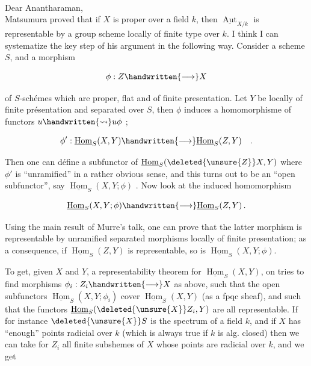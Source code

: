 \\

Dear Anantharaman,\\

Matsumura proved that if $X$ is proper over a field $k$, then $\underline{\operatorname{Aut}}_{X/k}$ is representable by a group scheme locally of finite type over $k$. I think I can systematize the key step of his argument in the following way. Consider a scheme $S$, and a morphism

\[
\phi: Z\handwritten{\longrightarrow} X
\]

of $S$-schémes which are proper, flat and of finite presentation. Let $Y$ be locally of finite présentation and separated over $S$, then $\phi$ induces a homomorphisme of functors $u\handwritten{\leadsto}u\phi$ ;

\[
\phi':\underline{\operatorname{Hom}}_S(X,Y)\handwritten{\longrightarrow}\underline{\operatorname{Hom}}_S(Z,Y)\quad .
\]

Then one can défine a subfunctor of $\underline{\operatorname{Hom}}_S(\deleted{\unsure{Z}}X,Y)$ where $\phi'$ is ``unramified'' in a rather obvious sense, and this turns out to be an ``open subfunctor'', say $\underline{\operatorname{Hom}}_S(X,Y;\phi)$ . Now look at the induced homomorphism

\[
\underline{\operatorname{Hom}}_S(X,Y;\phi)\handwritten{\longrightarrow}\underline{\operatorname{Hom}}_S(Z,Y)\,.
\]

Using the main result of Murre's talk, one can prove that the latter morphism is representable by unramified separated morphisms locally of finite presentation; as a consequence, if $\underline{\operatorname{Hom}}_S(Z,Y)$ is representable, so is $\underline{\operatorname{Hom}}_S(X,Y;\phi)$.

To get, given $X$ and $Y$, a representability theorem for $\underline{\operatorname{Hom}}_S(X,Y)$, on tries to find morphisms $\phi_i:Z_i\handwritten{\longrightarrow}X$ as above, such that the open subfunctors $\underline{\operatorname{Hom}}_S(X,Y;\phi_i)$ cover $\underline{\operatorname{Hom}}_S(X,Y)$ (as a fpqc sheaf), and such that the functors $\underline{\operatorname{Hom}}_S(\deleted{\unsure{X}}Z_i,Y)$ are all representable. If for instance $\deleted{\unsure{X}}S$ is the spectrum of a field $k$, and if $X$ has ``enough'' points radicial over $k$ (which is always true if $k$ is alg. closed) then we can take for $Z_i$ all finite subshemes of $X$ whose points are radicial over $k$, and we get

